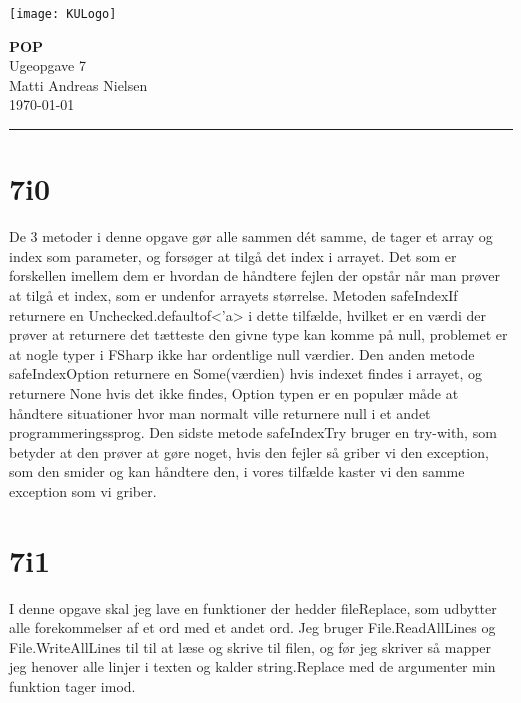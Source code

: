 \documentclass[12pt, a4paper, hidelinks]{article}
\begin{document}
\begin{minipage}[b]{1.0\linewidth}
\texttt{[image: KULogo]}

\vspace*{-16ex}
\begin{center}
    {\Large \bf POP} \vspace*{1ex} \\
    {\large Ugeopgave 7} \vspace*{1ex} \\
    {\large Matti Andreas Nielsen  } \\
    {\large \today{}  }
\end{center}
\vspace*{-3pt}
{\color{KU-red}\hrule}
\end{minipage}
\vspace{2ex}

\tableofcontents \newpage

\section{7i0}
De 3 metoder i denne opgave gør alle sammen dét samme, de tager et array og index som parameter,
og forsøger at tilgå det index i arrayet. Det som er forskellen imellem dem er hvordan de håndtere 
fejlen der opstår når man prøver at tilgå et index, som er undenfor arrayets størrelse. Metoden 
safeIndexIf returnere en Unchecked.defaultof<'a> i dette tilfælde, hvilket er en værdi der prøver 
at returnere det tætteste den givne type kan komme på null,
problemet er at nogle typer i FSharp ikke har ordentlige null værdier. Den anden metode 
safeIndexOption returnere en Some(værdien) hvis indexet findes i arrayet, og returnere 
None hvis det ikke findes, Option typen er en populær måde at håndtere situationer hvor
man normalt ville returnere null i et andet programmeringssprog. 
Den sidste metode safeIndexTry bruger en try-with, som betyder at den prøver at gøre noget, 
hvis den fejler så griber vi den exception, som den smider og kan håndtere den, i vores
tilfælde kaster vi den samme exception som vi griber.

\section{7i1}
I denne opgave skal jeg lave en funktioner der hedder fileReplace, som udbytter alle forekommelser af et ord med et andet ord. Jeg bruger File.ReadAllLines og File.WriteAllLines
til til at læse og skrive til filen, og før jeg skriver så mapper jeg henover alle linjer i texten og kalder string.Replace med de argumenter min funktion tager imod.
\end{document}
